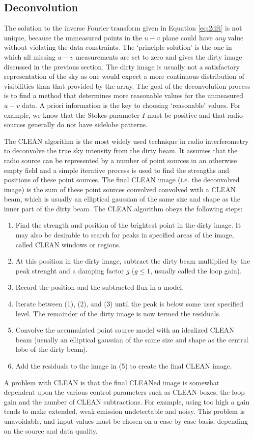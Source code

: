 \subsection{Deconvolution}\label{subsec:4.3}
The solution to the inverse Fourier transform given in Equation \ref{eq:2dft}
 is not unique, because the unmeasured points in the $u-v$ plane could have \textit{any} value without violating the data constraints. The `principle solution' is the one in which all missing $u-v$ measurements are set to zero and gives the dirty image discussed in the previous section. The dirty image is usually not a satisfactory representation of the sky as one would expect a more continuous distribution of visibilities than that provided by the array. The goal of the deconvolution process is to find a method that determines more reasonable values for the unmeasured $u-v$ data. A priori information is the key to choosing `reasonable' values. For example, we know that the Stokes parameter $I$ must be positive and that radio sources generally do not have sidelobe patterns.
 
The CLEAN algorithm \citep{hogbom_1974} is the most widely used technique in radio interferometry to deconvolve the true sky intensity from the dirty beam. It assumes that the radio source can be represented by a number of point sources in an otherwise empty field and a simple iterative process is used to find the strengths and positions of these point sources. The final CLEAN image (i.e. the deconvolved image) is the sum of these point sources convolved convolved with a CLEAN beam, which is usually an elliptical gaussian of the same size and shape as the inner part of the dirty beam. The CLEAN algorithm obeys the following steps:
\begin{enumerate}
\item Find the strength and position of the brightest point in the dirty image. It may also be desirable to search for peaks in specified areas of the image, called CLEAN windows or regions.
\item At this position in the dirty image, subtract the dirty beam multiplied by the peak strenght and a damping factor $g$ ($g \le 1$, usually called the loop gain).
\item Record the position and the subtracted flux in a model.
\item Iterate between (1), (2), and (3) until the peak is below some user specified level. The remainder of the dirty image is now  termed the residuals.
\item Convolve the accumulated point source model with an idealized CLEAN beam (usually an elliptical gaussian of the same size and shape as the central lobe of the dirty beam).
\item Add the residuals to the image in (5) to create the final CLEAN image.
\end{enumerate}
A problem with CLEAN is that the final CLEANed image is somewhat dependent upon the various control parameters such as CLEAN boxes, the loop gain and the number of CLEAN subtractions. For example, using too high a gain tends to make extended, weak emission undetectable and noisy. This problem is unavoidable, and input values must be chosen on a case by case basis, depending on the source and data quality.

